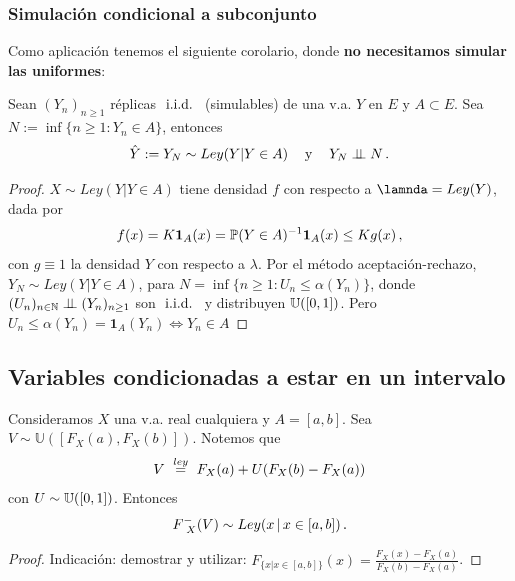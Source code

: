 \subsubsection{Simulación condicional a subconjunto}
Como aplicación tenemos el siguiente corolario, donde \textbf{no necesitamos simular las uniformes}:
\begin{corolary}
\label{corclase7}
\newline Sean $(Y_n)_{n\geq 1}$ réplicas $\iid$ (simulables) de una v.a. $Y$ en $E$ y $A\subset E$. Sea $N:=\inf\{n\geq 1: Y_n\in A\}$, entonces
$$ \hat{Y}:=Y_N\sim Ley(Y|Y\in A) \espacio \mbox{ y }\espacio Y_N\indep N \, .$$
\end{corolary}
\begin{proof}
\gris
$X\sim Ley(Y|Y\in A)$ tiene densidad $f$ con respecto a $\lamnda=Ley(Y)$, dada por
$$ f(x) = K\mathbf{1}_A(x) = \P(Y\in A)^{-1}\mathbf{1}_A(x)\leq K g(x) \, ,$$
con $g\equiv 1$ la densidad $Y$ con respecto a $\lambda$.  Por el método aceptación-rechazo, $Y_N\sim Ley(Y|Y\in A)$, para $N=\inf\{n\geq1:U_n\leq\alpha(Y_n)\}$, donde $(U_n)_{n\in\N}\indep (Y_n)_{n\geq1}$ son $\iid$ y distribuyen $\unif$. Pero $U_n\leq\alpha(Y_n)=\mathbf{1}_A(Y_n)\Longleftrightarrow Y_n\in A$
\findem
\negro
\end{proof}

\subsection{Variables condicionadas a estar en un intervalo}
\begin{proposition}
Consideramos $X$ una v.a. real cualquiera y $A=[a,b]$. Sea $V\sim\mathbb{U}([F_X(a),F_X(b)])$.
Notemos que 
$$V\igualley F_X(a)+U(F_X(b)-F_X(a))$$
con $U\sim \unif$. Entonces
$$ \Finvgen (V) \sim Ley(x \, |\, x\in[a,b]) \, .$$
\end{proposition}
\begin{proof}
\ejercicio
\newline \gris Indicación: demostrar y utilizar: $F_{\{x|x\in[a,b]\}}(x)=\displaystyle\frac{F_X(x)-F_X(a)}{F_X(b)-F_X(a)}$. \negro
\end{proof}
